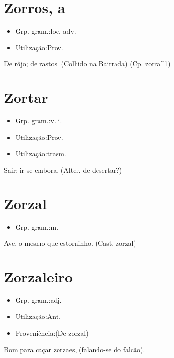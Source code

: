 \section{Zorros, a}
\begin{itemize}
\item {Grp. gram.:loc. adv.}
\end{itemize}
\begin{itemize}
\item {Utilização:Prov.}
\end{itemize}
De rôjo; de rastos. (Colhido na Bairrada)
(Cp. \textunderscore zorra\textunderscore ^1)
\section{Zortar}
\begin{itemize}
\item {Grp. gram.:v. i.}
\end{itemize}
\begin{itemize}
\item {Utilização:Prov.}
\end{itemize}
\begin{itemize}
\item {Utilização:trasm.}
\end{itemize}
Sair; ir-se embora.
(Alter. de \textunderscore desertar\textunderscore ?)
\section{Zorzal}
\begin{itemize}
\item {Grp. gram.:m.}
\end{itemize}
Ave, o mesmo que \textunderscore estorninho\textunderscore .
(Cast. \textunderscore zorzal\textunderscore )
\section{Zorzaleiro}
\begin{itemize}
\item {Grp. gram.:adj.}
\end{itemize}
\begin{itemize}
\item {Utilização:Ant.}
\end{itemize}
\begin{itemize}
\item {Proveniência:(De \textunderscore zorzal\textunderscore )}
\end{itemize}
Bom para caçar zorzaes, (falando-se do falcão).
